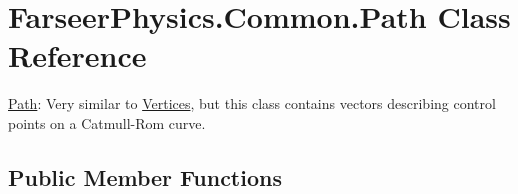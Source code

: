 \hypertarget{class_farseer_physics_1_1_common_1_1_path}{\section{Farseer\+Physics.\+Common.\+Path Class Reference}
\label{class_farseer_physics_1_1_common_1_1_path}
}


\hyperlink{class_farseer_physics_1_1_common_1_1_path}{Path}\+: Very similar to \hyperlink{class_farseer_physics_1_1_common_1_1_vertices}{Vertices}, but this class contains vectors describing control points on a Catmull-\/\+Rom curve.  


\subsection*{Public Member Functions}
